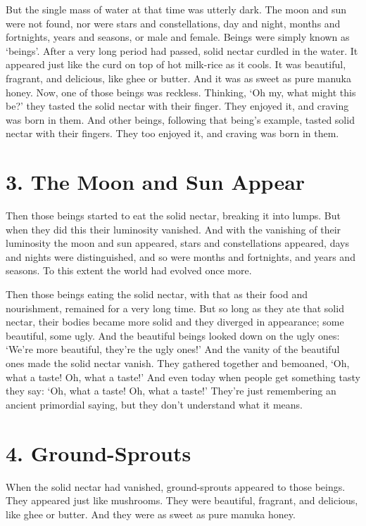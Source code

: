 \documentclass[12pt,openany]{book}%
\begin{document}
But the single mass of water at that time was utterly dark. The moon and sun were not found, nor were stars and constellations, day and night, months and fortnights, years and seasons, or male and female. Beings were simply known as ‘beings’. After a very long period had passed, solid nectar curdled in the water. It appeared just like the curd on top of hot milk-rice as it cools. It was beautiful, fragrant, and delicious, like ghee or butter. And it was as sweet as pure manuka honey. Now, one of those beings was reckless. Thinking, ‘Oh my, what might this be?’ they tasted the solid nectar with their finger. They enjoyed it, and craving was born in them. And other beings, following that being’s example, tasted solid nectar with their fingers. They too enjoyed it, and craving was born in them. 

\section*{3. The Moon and Sun Appear }

Then those beings started to eat the solid nectar, breaking it into lumps. But when they did this their luminosity vanished. And with the vanishing of their luminosity the moon and sun appeared, stars and constellations appeared, days and nights were distinguished, and so were months and fortnights, and years and seasons. To this extent the world had evolved once more. 

Then those beings eating the solid nectar, with that as their food and nourishment, remained for a very long time. But so long as they ate that solid nectar, their bodies became more solid and they diverged in appearance; some beautiful, some ugly. And the beautiful beings looked down on the ugly ones: ‘We’re more beautiful, they’re the ugly ones!’ And the vanity of the beautiful ones made the solid nectar vanish. They gathered together and bemoaned, ‘Oh, what a taste! Oh, what a taste!’ And even today when people get something tasty they say: ‘Oh, what a taste! Oh, what a taste!’ They’re just remembering an ancient primordial saying, but they don’t understand what it means. 

\section*{4. Ground-Sprouts }

When the solid nectar had vanished, ground-sprouts appeared to those beings. They appeared just like mushrooms. They were beautiful, fragrant, and delicious, like ghee or butter. And they were as sweet as pure manuka honey. 
\end{document}
